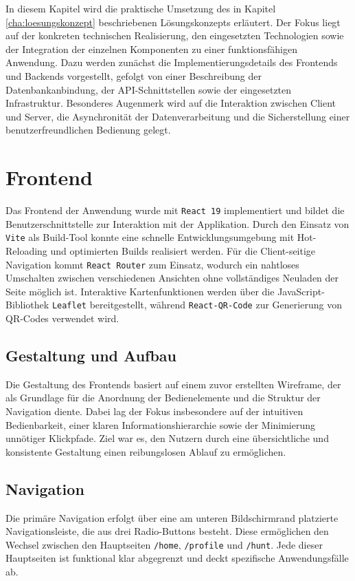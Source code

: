 \documentclass[oneside]{ausarbeitung}
\begin{document}
In diesem Kapitel wird die praktische Umsetzung des in Kapitel \ref{cha:loesungskonzept} beschriebenen Lösungskonzepts erläutert.  
Der Fokus liegt auf der konkreten technischen Realisierung, den eingesetzten Technologien sowie der Integration der einzelnen Komponenten zu einer funktionsfähigen Anwendung.  
Dazu werden zunächst die Implementierungsdetails des Frontends und Backends vorgestellt, gefolgt von einer Beschreibung der Datenbankanbindung, der API-Schnittstellen sowie der eingesetzten Infrastruktur.  
Besonderes Augenmerk wird auf die Interaktion zwischen Client und Server, die Asynchronität der Datenverarbeitung und die Sicherstellung einer benutzerfreundlichen Bedienung gelegt.  

\section{Frontend}

Das Frontend der Anwendung wurde mit \texttt{React 19} implementiert und bildet die Benutzerschnittstelle zur Interaktion mit der Applikation.  
Durch den Einsatz von \texttt{Vite} als Build-Tool konnte eine schnelle Entwicklungsumgebung mit Hot-Reloading und optimierten Builds realisiert werden.  
Für die Client-seitige Navigation kommt \texttt{React Router} zum Einsatz, wodurch ein nahtloses Umschalten zwischen verschiedenen Ansichten ohne vollständiges Neuladen der Seite möglich ist.  
Interaktive Kartenfunktionen werden über die JavaScript-Bibliothek \texttt{Leaflet} bereitgestellt, während \texttt{React-QR-Code} zur Generierung von QR-Codes verwendet wird.

\subsection{Gestaltung und Aufbau}
Die Gestaltung des Frontends basiert auf einem zuvor erstellten Wireframe, der als Grundlage für die Anordnung der Bedienelemente und die Struktur der Navigation diente.  
Dabei lag der Fokus insbesondere auf der intuitiven Bedienbarkeit, einer klaren Informationshierarchie sowie der Minimierung unnötiger Klickpfade.  
Ziel war es, den Nutzern durch eine übersichtliche und konsistente Gestaltung einen reibungslosen Ablauf zu ermöglichen.

\subsection{Navigation}
Die primäre Navigation erfolgt über eine am unteren Bildschirmrand platzierte Navigationsleiste, die aus drei Radio-Buttons besteht.  
Diese ermöglichen den Wechsel zwischen den Hauptseiten \texttt{/home}, \texttt{/profile} und \texttt{/hunt}.  
Jede dieser Hauptseiten ist funktional klar abgegrenzt und deckt spezifische Anwendungsfälle ab.
\end{document}
